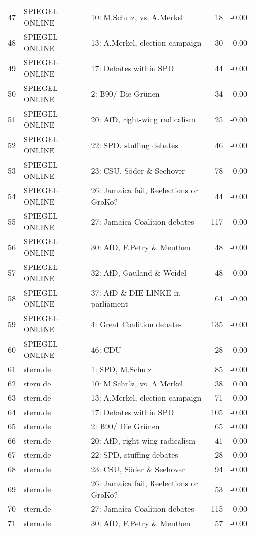 \begin{table}[ht]
\begin{adjustbox}{width=\textwidth,totalheight=\textheight,keepaspectratio}
\begin{tabular}{rllrr}
  47 & SPIEGEL ONLINE & 10: M.Schulz, vs. A.Merkel &  18 & -0.00 \\ 
  48 & SPIEGEL ONLINE & 13: A.Merkel, election campaign &  30 & -0.00 \\ 
  49 & SPIEGEL ONLINE & 17: Debates within SPD &  44 & -0.00 \\ 
  50 & SPIEGEL ONLINE & 2: B90/ Die Grünen &  34 & -0.00 \\ 
  51 & SPIEGEL ONLINE & 20: AfD, right-wing radicalism &  25 & -0.00 \\ 
  52 & SPIEGEL ONLINE & 22: SPD, stuffing debates &  46 & -0.00 \\ 
  53 & SPIEGEL ONLINE & 23: CSU, Söder \& Seehover &  78 & -0.00 \\ 
  54 & SPIEGEL ONLINE & 26: Jamaica fail, Reelections or GroKo? &  44 & -0.00 \\ 
  55 & SPIEGEL ONLINE & 27: Jamaica Coalition debates & 117 & -0.00 \\ 
  56 & SPIEGEL ONLINE & 30: AfD, F.Petry \& Meuthen &  48 & -0.00 \\ 
  57 & SPIEGEL ONLINE & 32: AfD, Gauland \& Weidel &  48 & -0.00 \\ 
  58 & SPIEGEL ONLINE & 37: AfD \& DIE LINKE in parliament &  64 & -0.00 \\ 
  59 & SPIEGEL ONLINE & 4: Great Coalition debates & 135 & -0.00 \\ 
  60 & SPIEGEL ONLINE & 46: CDU &  28 & -0.00 \\ 
  61 & stern.de & 1: SPD, M.Schulz &  85 & -0.00 \\ 
  62 & stern.de & 10: M.Schulz, vs. A.Merkel &  38 & -0.00 \\ 
  63 & stern.de & 13: A.Merkel, election campaign &  71 & -0.00 \\ 
  64 & stern.de & 17: Debates within SPD & 105 & -0.00 \\ 
  65 & stern.de & 2: B90/ Die Grünen &  65 & -0.00 \\ 
  66 & stern.de & 20: AfD, right-wing radicalism &  41 & -0.00 \\ 
  67 & stern.de & 22: SPD, stuffing debates &  28 & -0.00 \\ 
  68 & stern.de & 23: CSU, Söder \& Seehover &  94 & -0.00 \\ 
  69 & stern.de & 26: Jamaica fail, Reelections or GroKo? &  53 & -0.00 \\ 
  70 & stern.de & 27: Jamaica Coalition debates & 115 & -0.00 \\ 
  71 & stern.de & 30: AfD, F.Petry \& Meuthen &  57 & -0.00 \\ 

\end{tabular}
\end{adjustbox}
\end{table}
